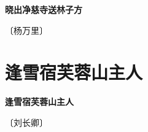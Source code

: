 \documentclass[12pt,UTF-8,openany,fontset=none]{ctexbook}
\begin{document}
\begin{center}
    {\bfseries 晓出净慈寺送林子方}
\end{center}

\begin{center}
    \vspace{10pt}
    
    \begin{large}
        
        〔杨万里〕
        
    \end{large}
    
    \vspace{8pt}
    
    \begin{huge}
        
        \phantom{。}

        \phantom{。}
        
        \phantom{。}

        \phantom{。}
        
    \end{huge}
    
\end{center}

\vspace{8pt}
\clearpage


\section{逢雪宿芙蓉山主人}



\begin{center}
    {\bfseries 逢雪宿芙蓉山主人}
\end{center}

\begin{center}
    \vspace{10pt}
    
    \begin{large}
        
        〔刘长卿〕
        
    \end{large}
    
    \vspace{8pt}
    
    \begin{huge}
        
        \phantom{。}

        \phantom{。}
        
        \phantom{。}

        \phantom{。}
        
    \end{huge}
    
\end{center}
\end{document}
